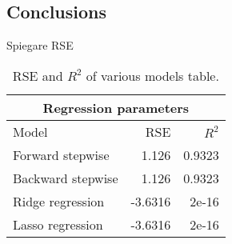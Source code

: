 \subsection{Conclusions}

Spiegare RSE

\begin{table}[H]
	\centering
	\begin{tabular}{|| l | r | r ||} 
		\hline
		\multicolumn{3}{|c|}{Regression parameters} \\
		\hline
		Model & RSE & $R^2$ \\
		\hline
		Forward stepwise & 1.126 & 0.9323 \\
		\hline
		Backward stepwise & 1.126 & 0.9323 \\
		\hline
		Ridge regression & -3.6316 & 2e-16 \\
		\hline
		Lasso regression & -3.6316 & 2e-16 \\
		\hline
	\end{tabular}
	\caption{RSE and $R^2$ of various models table.}
	\label{table:RegEvalParams}
\end{table}